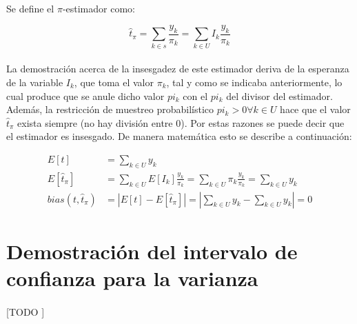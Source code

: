 \documentclass{article}
\begin{document}
    \paragraph{}
    Se define el $\pi$-estimador como:

    \begin{equation}
      \widehat{t}_\pi = \sum_{k \in s} \frac{y_k}{\pi_k} = \sum_{k \in U} I_k \frac{y_k}{\pi_k}
    \end{equation}

    \paragraph{}
    La demostración acerca de la insesgadez de este estimador deriva de la esperanza de la variable $I_k$, que toma el valor $\pi_k$, tal y como se indicaba anteriormente, lo cual produce que se anule dicho valor $pi_k$ con el $pi_k$  del divisor del estimador. Además, la restricción de muestreo probabilístico $pi_k > 0 \forall k \in U$ hace que el valor $\widehat{t}_\pi$ exista siempre (no hay división entre 0). Por estas razones se puede decir que el estimador es insesgado. De manera matemática esto se describe a continuación:

    \begin{align}
      E[t] &= \sum_{k \in U} y_k \\
      E[\widehat{t}_\pi] &= \sum_{k \in U} E[I_k] \frac{y_k}{\pi_k} = \sum_{k \in U} \pi_k \frac{y_k}{\pi_k} =\sum_{k \in U} y_k \\
      bias(t, \widehat{t}_\pi) &= \left| E[t] - E[\widehat{t}_\pi] \right| = \left| \sum_{k \in U} y_k - \sum_{k \in U} y_k \right| = 0
    \end{align}

  \section{Demostración del intervalo de confianza para la varianza}
  \label{sec:demostration_1}

    \paragraph{}
    [TODO ]

	\nocite{muest2017}

  
  
\end{document}
